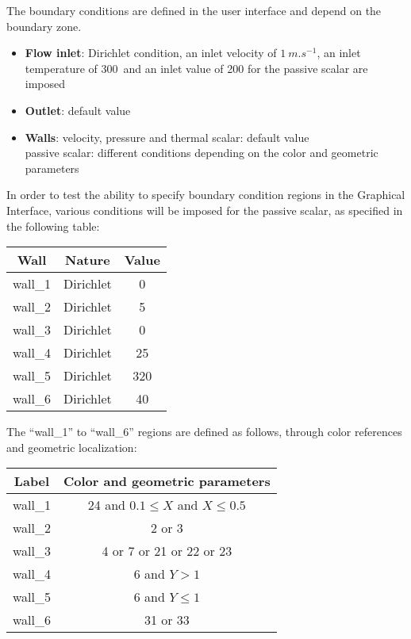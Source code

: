 The boundary conditions are defined in the user interface and depend on the
boundary zone.

\begin{itemize}
        \item {\bfseries Flow inlet}: Dirichlet condition, an inlet velocity of
$1\ m.s^{-1}$, an inlet temperature of 300\degresC\ and an inlet value of 200
for the passive scalar are imposed
        \item {\bfseries Outlet}: default value
        \item {\bfseries Walls}: velocity, pressure and thermal scalar: default value \\
                    \hspace*{1.25cm} passive scalar: different conditions
depending on the color and geometric parameters
\end{itemize}

In order to test the ability to specify boundary condition regions in the
Graphical Interface, various conditions will be imposed for the passive scalar,
as specified in the following table:

\begin{center}
\begin{tabular}{|c|c|c|}
\hline
Wall & Nature & Value \\
\hline
wall\_1 & Dirichlet  & 0 \\
\hline
wall\_2 & Dirichlet  & 5 \\
\hline
wall\_3 & Dirichlet  & 0 \\
\hline
wall\_4 & Dirichlet  & 25 \\
\hline
wall\_5 & Dirichlet  & 320 \\
\hline
wall\_6 & Dirichlet  & 40 \\
\hline
\end{tabular}
\end{center}

The ``wall\_1'' to ``wall\_6'' regions are defined as follows, through color
references and geometric localization:
\begin{center}
\begin{tabular}{c|c}
Label & Color and geometric parameters \\
\hline
wall\_1 & 24 and $0.1\leqslant X$ and $X\leqslant 0.5$ \\
wall\_2 & 2 or 3 \\
wall\_3 & 4 or 7 or 21 or 22 or 23 \\
wall\_4 & 6 and $Y>1$ \\
wall\_5 & 6 and $Y\leqslant1$ \\
wall\_6 & 31 or 33 \\
\end{tabular}
\end{center}

